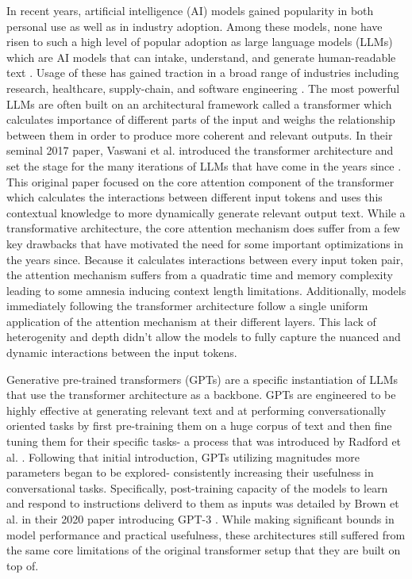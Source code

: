 In recent years, artificial intelligence (AI) models gained popularity in both personal use 
as well as in industry adoption. Among these models, none have risen to such a high level of 
popular adoption as large language models (LLMs) which are AI models that can intake, understand, and generate
human-readable text \cite{brown2020languagemodelsfewshotlearners}. Usage of these has gained traction in a broad 
range of industries including 
research, healthcare, supply-chain, and software engineering 
\cite {liang2024mappingincreasingusellms} \cite{ZHANG2025102883} \cite{urlana2024llmsindustriallensdeciphering}. 
The most powerful LLMs are often built on 
an architectural framework called a transformer which calculates importance of different parts of the input and weighs 
the relationship between them in order to produce more coherent and relevant outputs.
In their seminal 2017 paper, Vaswani et al. introduced the 
transformer architecture and set the stage for the many iterations of LLMs that 
have come in the years since \cite{vaswani2023attentionneed}. This original paper focused on the core attention 
component of the transformer which calculates the interactions between different
input tokens and uses this contextual knowledge to more dynamically generate 
relevant output text. While a transformative architecture, the core attention mechanism does suffer from 
a few key drawbacks that have motivated the need for some important optimizations in the years since. 
Because it calculates interactions between every input token pair, the attention mechanism suffers from 
a quadratic time and memory complexity leading to some amnesia inducing context length limitations. Additionally, 
models immediately following the transformer architecture follow a single uniform application of the attention 
mechanism at their different layers. This lack of heterogenity and depth didn't allow the models to 
fully capture the nuanced and dynamic interactions between the input tokens.

Generative pre-trained transformers (GPTs) are a specific instantiation of LLMs that use the transformer architecture as a backbone. 
GPTs are engineered to be highly effective at generating relevant text and at performing 
conversationally oriented tasks by first pre-training them on a huge corpus of text and then fine tuning
them for their specific tasks- a process that was introduced by Radford et al. \cite{radford2018improving}. Following 
that initial introduction, GPTs utilizing magnitudes more parameters began to be explored- consistently
increasing their usefulness in conversational tasks. Specifically, post-training capacity of the 
models to learn and respond to instructions deliverd to them as inputs was detailed by Brown et al. in their 
2020 paper introducing GPT-3 \cite{brown2020languagemodelsfewshotlearners}. 
While making significant bounds in model performance and practical usefulness, these architectures still 
suffered from the same core limitations of the original transformer setup that they are built on top of. 


